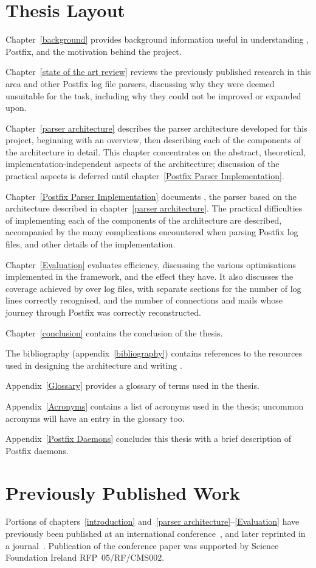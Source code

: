 \section{Thesis Layout}

Chapter~\ref{background} provides background information useful in
understanding , Postfix, and the motivation behind the
project.

Chapter~\ref{state of the art review} reviews the previously published
research in this area and other Postfix log file parsers, discussing why
they were deemed unsuitable for the task, including why they could not be
improved or expanded upon.

Chapter~\ref{parser architecture} describes the parser architecture
developed for this project, beginning with an overview, then describing
each of the components of the architecture in detail.  This chapter
concentrates on the abstract, theoretical, implementation-independent
aspects of the architecture; discussion of the practical aspects is
deferred until chapter~\ref{Postfix Parser Implementation}.

Chapter~\ref{Postfix Parser Implementation} documents \parsername{}, the
parser based on the architecture described in chapter~\ref{parser
architecture}.  The practical difficulties of implementing each of the
components of the architecture are described, accompanied by the many
complications encountered when parsing Postfix log files, and other details
of the implementation.

Chapter~\ref{Evaluation} evaluates \parsernames{} efficiency, discussing
the various optimisations implemented in the framework, and the effect they
have.  It also discusses the coverage achieved by \parsername{} over
\numberOFlogFILES{} log files, with separate sections for the number of log
lines correctly recognised, and the number of connections and mails whose
journey through Postfix was correctly reconstructed.

Chapter~\ref{conclusion} contains the conclusion of the thesis.

The bibliography (appendix~\ref{bibliography}) contains references to the
resources used in designing the architecture and writing \parsername{}.

Appendix~\ref{Glossary} provides a glossary of terms used in the thesis.

Appendix~\ref{Acronyms} contains a list of acronyms used in the thesis;
uncommon acronyms will have an entry in the glossary too.

Appendix~\ref{Postfix Daemons} concludes this thesis with a brief
description of Postfix daemons.

\section{Previously Published Work}

Portions of chapters~\ref{introduction} and~\ref{parser
architecture}--\ref{Evaluation} have previously been published at an
international conference~\cite{sgai-2008}, and later reprinted in a
journal~\cite{elsevier-2009}.  Publication of the conference paper was
supported by Science Foundation Ireland RFP~05/RF/CMS002.
